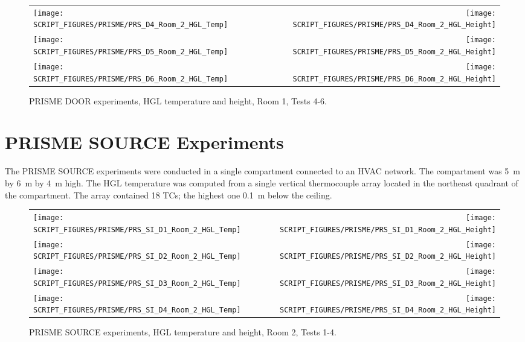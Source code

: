 \begin{figure}[p]
\begin{tabular*}{\textwidth}{l@{\extracolsep{\fill}}r}
\texttt{[image: SCRIPT\_FIGURES/PRISME/PRS\_D4\_Room\_2\_HGL\_Temp]} &
\texttt{[image: SCRIPT\_FIGURES/PRISME/PRS\_D4\_Room\_2\_HGL\_Height]} \\
\texttt{[image: SCRIPT\_FIGURES/PRISME/PRS\_D5\_Room\_2\_HGL\_Temp]} &
\texttt{[image: SCRIPT\_FIGURES/PRISME/PRS\_D5\_Room\_2\_HGL\_Height]} \\
\texttt{[image: SCRIPT\_FIGURES/PRISME/PRS\_D6\_Room\_2\_HGL\_Temp]} &
\texttt{[image: SCRIPT\_FIGURES/PRISME/PRS\_D6\_Room\_2\_HGL\_Height]}
\end{tabular*}
\caption[PRISME DOOR experiments, HGL temperature and height, Room 2, Tests 4-6]
{PRISME DOOR experiments, HGL temperature and height, Room 1, Tests 4-6.}
\label{PRISME_HGL_4}
\end{figure}


\clearpage

\section{PRISME SOURCE Experiments}

The PRISME SOURCE experiments were conducted in a single compartment connected to an HVAC network. The compartment was 5~m by 6~m by 4~m high. The HGL temperature was computed from a single vertical thermocouple array located in the northeast quadrant of the compartment. The array contained 18 TCs; the highest one 0.1~m below the ceiling.

\newpage

\begin{figure}[p]
\begin{tabular*}{\textwidth}{l@{\extracolsep{\fill}}r}
\texttt{[image: SCRIPT\_FIGURES/PRISME/PRS\_SI\_D1\_Room\_2\_HGL\_Temp]} &
\texttt{[image: SCRIPT\_FIGURES/PRISME/PRS\_SI\_D1\_Room\_2\_HGL\_Height]} \\
\texttt{[image: SCRIPT\_FIGURES/PRISME/PRS\_SI\_D2\_Room\_2\_HGL\_Temp]} &
\texttt{[image: SCRIPT\_FIGURES/PRISME/PRS\_SI\_D2\_Room\_2\_HGL\_Height]} \\
\texttt{[image: SCRIPT\_FIGURES/PRISME/PRS\_SI\_D3\_Room\_2\_HGL\_Temp]} &
\texttt{[image: SCRIPT\_FIGURES/PRISME/PRS\_SI\_D3\_Room\_2\_HGL\_Height]} \\
\texttt{[image: SCRIPT\_FIGURES/PRISME/PRS\_SI\_D4\_Room\_2\_HGL\_Temp]} &
\texttt{[image: SCRIPT\_FIGURES/PRISME/PRS\_SI\_D4\_Room\_2\_HGL\_Height]}
\end{tabular*}
\caption[PRISME SOURCE experiments, HGL temperature and height, Room 2, Tests 1-4]
{PRISME SOURCE experiments, HGL temperature and height, Room 2, Tests 1-4.}
\label{PRISME_SI_HGL_1}
\end{figure}

